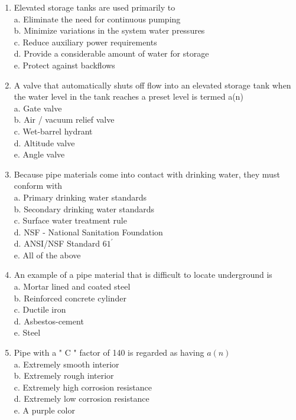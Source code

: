 \begin{enumerate}[1.]
\item Elevated storage tanks are used primarily to\\
a. Eliminate the need for continuous pumping\\
b. Minimize variations in the system water pressures\\
c. Reduce auxiliary power requirements\\
d. Provide a considerable amount of water for storage\\
e. Protect against backflows

\item A valve that automatically shuts off flow into an elevated storage tank when the water level in the tank reaches a preset level is termed a(n)\\
a. Gate valve\\
b. Air / vacuum relief valve\\
c. Wet-barrel hydrant\\
d. Altitude valve\\
e. Angle valve

  \item Because pipe materials come into contact with drinking water, they must conform with\\
a. Primary drinking water standards\\
b. Secondary drinking water standards\\
c. Surface water treatment rule\\
d. NSF - National Sanitation Foundation\\
d. ANSI/NSF Standard $61^{\prime}$\\
e. All of the above\\

  \item An example of a pipe material that is difficult to locate underground is\\
a. Mortar lined and coated steel\\
b. Reinforced concrete cylinder\\
c. Ductile iron\\
d. Asbestos-cement\\
e. Steel\\

\item Pipe with a " $\mathrm{C}$ " factor of 140 is regarded as having $a(n)$\\
a. Extremely smooth interior\\
b. Extremely rough interior\\
c. Extremely high corrosion resistance\\
d. Extremely low corrosion resistance\\
e. A purple color\\


\end{enumerate}
